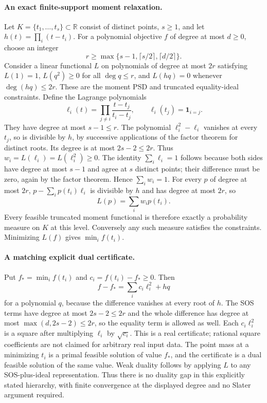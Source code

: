 \documentclass[11pt]{article}
\begin{document}
\paragraph{An exact finite-support moment relaxation.}
Let $K=\{t_1,\ldots,t_s\}\subset\mathbb R$ consist of distinct points,
$s\geq1$, and let $h(t)=\prod_i(t-t_i)$.
For a polynomial objective $f$ of degree at most $d\geq0$, choose an integer
\[
 r\geq\max\{s-1,\lceil s/2\rceil,\lceil d/2\rceil\}.
\]
Consider a linear functional $L$ on polynomials of degree at most $2r$
satisfying $L(1)=1$, $L(q^2)\geq0$ for all $\deg q\leq r$, and
$L(hq)=0$ whenever $\deg(hq)\leq2r$.
These are the moment PSD and truncated equality-ideal constraints.
Define the Lagrange polynomials
\[
 \ell_i(t)=\prod_{j\ne i}\frac{t-t_j}{t_i-t_j},
 \qquad \ell_i(t_j)=\mathbf1_{i=j}.
\]
They have degree at most $s-1\leq r$.
The polynomial $\ell_i^2-\ell_i$ vanishes at every $t_j$, so is divisible
by $h$, by successive applications of the factor theorem for distinct roots.
Its degree is at most $2s-2\leq2r$. Thus
$w_i=L(\ell_i)=L(\ell_i^2)\geq0$.
The identity $\sum_i\ell_i=1$ follows because both sides have degree at
most $s-1$ and agree at $s$ distinct points; their difference must be zero,
again by the factor theorem. Hence $\sum_iw_i=1$.
For every $p$ of degree at most $2r$,
$p-\sum_i p(t_i)\ell_i$ is divisible by $h$ and has degree at most $2r$,
so
\[
 L(p)=\sum_iw_i p(t_i).
\]
Every feasible truncated moment functional is therefore exactly a probability
measure on $K$ at this level. Conversely any such measure satisfies the
constraints. Minimizing $L(f)$ gives $\min_i f(t_i)$.

\paragraph{A matching explicit dual certificate.}
Put $f_*=\min_i f(t_i)$ and $c_i=f(t_i)-f_*\geq0$.
Then
\[
 f-f_*=\sum_i c_i\ell_i^2+hq
\]
for a polynomial $q$, because the difference vanishes at every root of $h$.
The SOS terms have degree at most $2s-2\leq2r$ and the whole difference
has degree at most $\max(d,2s-2)\leq2r$, so the equality term is allowed
as well. Each $c_i\ell_i^2$ is a square after multiplying $\ell_i$ by
$\sqrt{c_i}$. This is a real certificate; rational square coefficients are not
claimed for arbitrary real input data.
The point mass at a minimizing $t_i$ is a primal feasible solution of value
$f_*$, and the certificate is a dual feasible solution of the same value.
Weak duality follows by applying $L$ to any SOS-plus-ideal representation.
Thus there is no duality gap in this explicitly stated hierarchy, with finite
convergence at the displayed degree and no Slater argument required.
\end{document}
